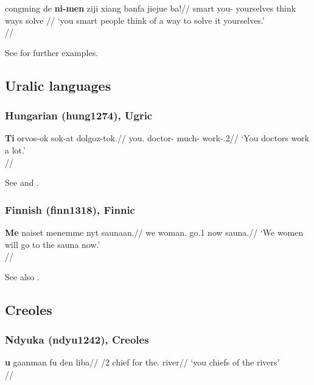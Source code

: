\documentclass[A4paper]{article}
\begin{document}
\ex \begingl
\gla congming de \textbf{ni-men} ziji xiang banfa jiejue ba!//
\glb smart \Lnk{} you-\Pl{} yourselves think ways solve \Exclam{}//
\glft `you smart people think of a way to solve it yourselves.'\\\citep[after][(53a)]{boskovichsieh2013}//
\endgl
\xe 

See \citet[sec. 7.3]{boskovichsieh2013} for further examples.


\subsection{Uralic languages}


\subsubsection{Hungarian (hung1274), Ugric}

\ex \begingl
\gla \textbf{Ti} orvos-ok sok-at dolgoz-tok.//
\glb you.\Pl{} doctor-\Pl{} much-\Acc{} work-\Indf.2\Pl//
\glft `You doctors work a lot.' \\\citep[269, (492)]{keneseietal1998}//
\endgl
\xe

See \citet[269]{keneseietal1998} and \citealp[559]{hoehn2015unagr}.

\newpage

\subsubsection{Finnish (finn1318), Finnic}

\ex \begingl
\gla \textbf{Me\textbf{}} naiset menemme nyt saunaan.//
\glb we woman.\Pl{} go.1\Pl{} now sauna.\Ill//
\glft `We women will go to the sauna now.'\\\citep[277, (1335)]{sulkalakarjalainen1992}//
\endgl
\xe

See also \citet[24f.]{hoehn2020ThirdGap}.


\subsection{Creoles}


\subsubsection{Ndyuka (ndyu1242), Creoles}

\ex \begingl
\gla \textbf{u} gaanman fu den liba//
/2\Pl{} chief for the.\Pl{} river//
\glft `you chiefs of the rivers'\\\citep[467, (2075)]{huttarhuttar1994}//
\endgl
\xe
\end{document}

